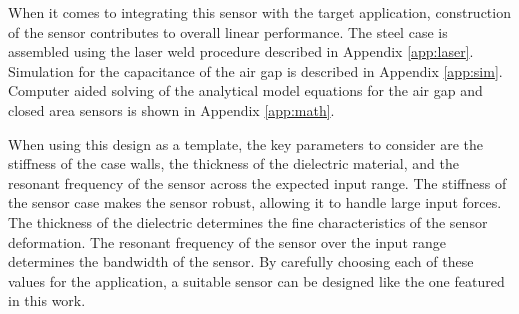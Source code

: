 When it comes to integrating this sensor with the target application,
construction of the sensor contributes to overall linear performance.
The steel case is assembled using the laser weld procedure described in Appendix \ref{app:laser}.
Simulation for the capacitance of the air gap is described in Appendix \ref{app:sim}.
Computer aided solving of the analytical model equations for the air gap and closed area sensors
is shown in Appendix \ref{app:math}. 

When using this design as a template, the key parameters to consider are the stiffness of the case walls,
the thickness of the dielectric material, and the resonant frequency of the sensor across the expected input range.
The stiffness of the sensor case makes the sensor robust, allowing it to handle large input forces.
The thickness of the dielectric determines the fine characteristics of the sensor deformation. 
The resonant frequency of the sensor over the input range determines the bandwidth of the sensor.
By carefully choosing each of these values for the application, a suitable sensor can be designed like 
the one featured in this work.


